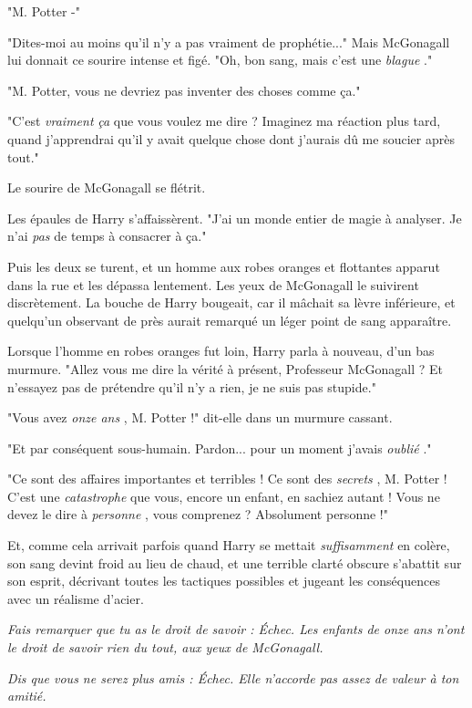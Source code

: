 "M. Potter -"

"Dites-moi au moins qu'il n'y a pas vraiment de prophétie..." Mais McGonagall lui donnait ce sourire intense et figé. "Oh, bon sang, mais c'est une \emph{blague} ."

"M. Potter, vous ne devriez pas inventer des choses comme ça."

"C'est \emph{vraiment}  \emph{ça}  que vous voulez me dire ? Imaginez ma réaction plus tard, quand j'apprendrai qu'il y avait quelque chose dont j'aurais dû me soucier après tout."

Le sourire de McGonagall se flétrit.

Les épaules de Harry s'affaissèrent. "J'ai un monde entier de magie à analyser. Je n'ai \emph{pas}  de temps à consacrer à ça."

Puis les deux se turent, et un homme aux robes oranges et flottantes apparut dans la rue et les dépassa lentement. Les yeux de McGonagall le suivirent discrètement. La bouche de Harry bougeait, car il mâchait sa lèvre inférieure, et quelqu'un observant de près aurait remarqué un léger point de sang apparaître.

Lorsque l'homme en robes oranges fut loin, Harry parla à nouveau, d'un bas murmure. "Allez vous me dire la vérité à présent, Professeur McGonagall ? Et n'essayez pas de prétendre qu'il n'y a rien, je ne suis pas stupide."

"Vous avez \emph{onze ans} , M. Potter !" dit-elle dans un murmure cassant.

"Et par conséquent sous-humain. Pardon... pour un moment j'avais \emph{oublié} ."

"Ce sont des affaires importantes et terribles ! Ce sont des \emph{secrets} , M. Potter ! C'est une \emph{catastrophe}  que vous, encore un enfant, en sachiez autant ! Vous ne devez le dire à \emph{personne} , vous comprenez ? Absolument personne !"

Et, comme cela arrivait parfois quand Harry se mettait \emph{suffisamment}  en colère, son sang devint froid au lieu de chaud, et une terrible clarté obscure s'abattit sur son esprit, décrivant toutes les tactiques possibles et jugeant les conséquences avec un réalisme d'acier.

\emph{Fais remarquer que tu as le droit de savoir : Échec. Les enfants de onze ans n'ont le droit de savoir rien du tout, aux yeux de McGonagall.} 

\emph{Dis que vous ne serez plus amis : Échec. Elle n'accorde pas assez de valeur à ton amitié.} 

